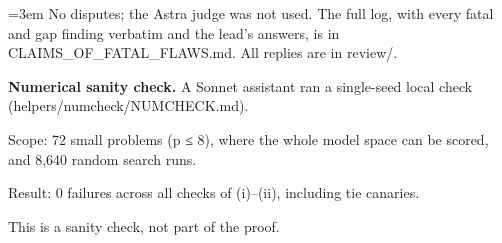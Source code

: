 \documentclass[11pt]{report}
\newenvironment{mdblock}{\begingroup\mdfont\raggedright\setlength{\parindent}{0pt}\setlength{\parskip}{0.55em}\emergencystretch=3em}{\par\endgroup}
\begin{document}
\begin{mdblock}
No disputes; the Astra judge was not used. The full log, with every fatal and gap finding verbatim and the lead's answers, is in {\mdtt CLAIMS\_\allowbreak{}OF\_\allowbreak{}FATAL\_\allowbreak{}FLAWS.\allowbreak{}md}. All replies are in {\mdtt review/\allowbreak{}}.

\textbf{Numerical sanity check.} A Sonnet assistant ran a single-seed local check ({\mdtt helpers/\allowbreak{}numcheck/\allowbreak{}NUMCHECK.\allowbreak{}md}).

\begin{mdbul}
\item Scope: 72 small problems (p ≤ 8), where the whole model space can be scored, and 8,640 random search runs.
\item Result: 0 failures across all checks of (i)–(ii), including tie canaries.
\item This is a sanity check, not part of the proof.
\end{mdbul}
\end{mdblock}
\end{document}
